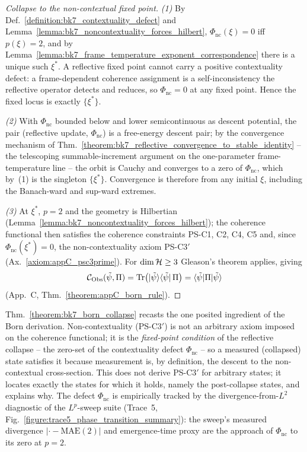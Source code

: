 \begin{proof}[Collapse to the non-contextual fixed point]
\label{proof:bk7_born_collapse}
\leavevmode
\emph{(1)} By Def.~\ref{definition:bk7_contextuality_defect} and
Lemma~\ref{lemma:bk7_noncontextuality_forces_hilbert}, $\Phi_{\mathrm{nc}}(\xi)=0$ iff
$p(\xi)=2$, and by Lemma~\ref{lemma:bk7_frame_temperature_exponent_correspondence}
there is a unique such $\xi^{\ast}$. A reflective fixed point cannot carry a positive
contextuality defect: a frame-dependent coherence assignment is a self-inconsistency
the reflective operator detects and reduces, so $\Phi_{\mathrm{nc}}=0$ at any fixed
point. Hence the fixed locus is exactly $\{\xi^{\ast}\}$.

\emph{(2)} With $\Phi_{\mathrm{nc}}$ bounded below and lower semicontinuous as descent
potential, the pair (reflective update, $\Phi_{\mathrm{nc}}$) is a free-energy descent
pair; by the convergence mechanism of
Thm.~\ref{theorem:bk7_reflective_convergence_to_stable_identity} -- the telescoping
summable-increment argument on the one-parameter frame-temperature line -- the orbit
is Cauchy and converges to a zero of $\Phi_{\mathrm{nc}}$, which by~(1) is the
singleton $\{\xi^{\ast}\}$. Convergence is therefore from any initial $\xi$, including
the Banach-ward and sup-ward extremes.

\emph{(3)} At $\xi^{\ast}$, $p=2$ and the geometry is Hilbertian
(Lemma~\ref{lemma:bk7_noncontextuality_forces_hilbert}); the coherence functional then
satisfies the coherence constraints PS-C1, C2, C4, C5 and, since
$\Phi_{\mathrm{nc}}(\xi^{\ast})=0$, the non-contextuality axiom PS-C3$'$
(Ax.~\ref{axiom:appC_psc3prime}). For $\dim\mathcal{H}\ge3$ Gleason's theorem applies,
giving
\[
\mathcal{C}_{\mathrm{Obs}}(\tilde\psi,\Pi)=\operatorname{Tr}\!\big(|\tilde\psi\rangle\langle\tilde\psi|\,\Pi\big)=\langle\tilde\psi|\Pi|\tilde\psi\rangle
\]
(App.~C, Thm.~\ref{theorem:appC_born_rule}).
\end{proof}

\begin{remark}
\label{remark:bk7_born_collapse_psc3prime}
Thm.~\ref{theorem:bk7_born_collapse} recasts the one posited ingredient of the Born
derivation. Non-contextuality (PS-C3$'$) is not an arbitrary axiom imposed on the
coherence functional; it is the \emph{fixed-point condition} of the reflective
collapse -- the zero-set of the contextuality defect $\Phi_{\mathrm{nc}}$ -- so a
measured (collapsed) state satisfies it because measurement is, by definition, the
descent to the non-contextual cross-section. This does not derive PS-C3$'$ for
arbitrary states; it locates exactly the states for which it holds, namely the
post-collapse states, and explains why. The defect $\Phi_{\mathrm{nc}}$ is empirically
tracked by the divergence-from-$L^{2}$ diagnostic of the $L^{p}$-sweep suite
(Trace~5, Fig.~\ref{figure:trace5_phase_transition_summary}): the sweep's measured
divergence $|{\cdot}-\text{MAE}(2)|$ and emergence-time proxy are the approach of
$\Phi_{\mathrm{nc}}$ to its zero at $p=2$.
\end{remark}

